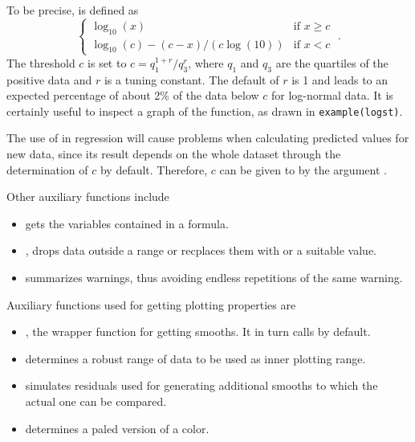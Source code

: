 \documentclass[11pt]{article}\usepackage[]{graphicx}\usepackage[]{color}
\begin{document}
To be precise,  is defined as
$$
         \left\{\begin{array}{ll}\log_{10}(x) & \mbox{if\ \ } x\ge c\\
         \log_{10}(c) - (c-x)/(c\log(10)) & \mbox{if\ \ } x< c
         \end{array}\right.
\;.$$
The threshold $c$ is set to
$ c = q_1^{1+r}/q_3^r$, where $q_1$ and $q_3$ are the quartiles of the 
positive data and $r$ is a tuning constant. 
The default of $r$ is 1 and leads to an expected
percentage of about 2\% of the data below $c$ for log-normal data.
It is certainly useful to inspect a graph of the function, as drawn in 
\texttt{example(logst)}.

The use of  in regression will cause problems when calculating
predicted values for new data, since its result depends on the whole
dataset through the determination of $c$ by default. 
Therefore, $c$ can be given to  by the argument .

Other auxiliary functions include
\begin{itemize}
\item
   gets the variables contained in a formula.
\item 
  , drops data outside a range or recplaces them with 
  or a suitable value.
\item
   summarizes warnings, thus avoiding endless repetitions of the
  same warning.
\end{itemize}

Auxiliary functions used for getting plotting properties are
\begin{itemize}
\item
  , the wrapper function for getting smooths.
  It in turn calls  by default.
\item 
   determines a robust range of data to be used as inner
  plotting range.
\item
   simulates residuals used for generating additional
  smooths to which the actual one can be compared.
\item
   determines a paled version of a color.
\end{itemize}
\end{document}
